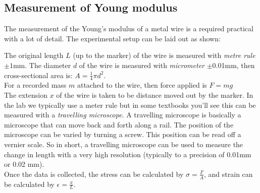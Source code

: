\subsection{Measurement of Young modulus}\label{ch-measure-E}

The measurement of the Young's modulus of a metal wire is a required practical with a lot of detail. The experimental setup can be laid out as shown:


\begin{figure}[ht]
	\centering
\end{figure}

The original length $L$ (up to the marker) of the wire is measured with \emph{metre rule} $\pm 1$mm. The diameter $d$ of the wire is measured with \emph{micrometer} $\pm$0.01mm, then cross-sectional area is: $A = \frac{1}{4}\pi d^2$.\\

For a recorded mass $m$ attached to the wire, then force applied is $F=mg$\\

The extension $x$ of the wire is taken to be distance moved out by the marker. In the lab we typically use a meter rule but in some textbooks you'll see this can be measured with a \emph{travelling microscope}. A travelling microscope is basically a microscope that can move back and forth along a rail. The position of the microscope can be varied by turning a screw. This position can be read off a vernier scale. So in short, a travelling microscope can be used to measure the change in length with a very high resolution (typically to a precision of 0.01mm or 0.02 mm).\\
Once the data is collected, the stress can be calculated by $\sigma = \frac{F}{A}$, and strain can be calculated by $\epsilon = \frac{x}{L}$.\\

